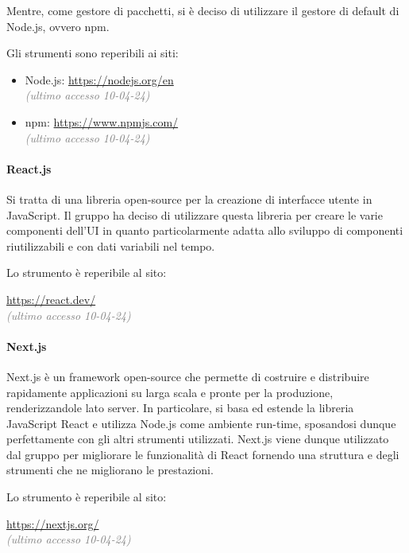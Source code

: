 \noindent Mentre, come gestore di pacchetti, si è deciso di utilizzare il gestore di default di Node.js, ovvero npm.

\noindent Gli strumenti sono reperibili ai siti:
\begin{center}
\begin{itemize}
    \item Node.js: \url{https://nodejs.org/en}\\ \textcolor{gray}{\textit{(ultimo accesso 10-04-24)}}
    \item npm: \url{https://www.npmjs.com/}\\ \textcolor{gray}{\textit{(ultimo accesso 10-04-24)}}
\end{itemize}
\end{center}

\paragraph{React.js}
Si tratta di una libreria open-source per la creazione di interfacce utente in JavaScript. Il gruppo ha deciso di utilizzare questa libreria per creare le varie componenti dell'UI in quanto particolarmente adatta allo sviluppo di componenti riutilizzabili e con dati variabili nel tempo.

\noindent Lo strumento è reperibile al sito:
\begin{center}
    \url{https://react.dev/}\\ \textcolor{gray}{\textit{(ultimo accesso 10-04-24)}}
\end{center}

\paragraph{Next.js}
Next.js è un framework open-source che permette di costruire e distribuire rapidamente applicazioni su larga scala e pronte per la produzione, renderizzandole lato server. In particolare, si basa ed estende la libreria JavaScript React e utilizza Node.js come ambiente run-time, sposandosi dunque perfettamente con gli altri strumenti utilizzati.
Next.js viene dunque utilizzato dal gruppo per migliorare le funzionalità di React fornendo una struttura e degli strumenti che ne migliorano le prestazioni. 
 
\noindent Lo strumento è reperibile al sito:
\begin{center}
    \url{https://nextjs.org/}\\ \textcolor{gray}{\textit{(ultimo accesso 10-04-24)}}
\end{center}

